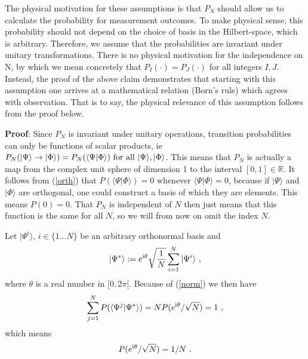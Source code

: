 \documentclass[12pt]{article}
\def\forall{\hbox{\rm for all}}
\def\beqn{\begin{eqnarray}}
\def\eeqn{\end{eqnarray}}
\begin{document}
The physical motivation for these assumptions is that $P_N$ should allow us to calculate the probability for measurement outcomes. To make physical sense, this probability should not depend on the choice of basis in the Hilbert-space, which is arbitrary. Therefore, we assume that the probabilities are invariant under unitary transformations. There is no physical motivation for the independence on N, by which we mean concretely that $P_I(\cdot) = P_J(\cdot)$ for all integers $I,J$. Instead, the proof of the above claim demonstrates that starting with this assumption one arrives at a mathematical relation (Born’s rule) which agrees with observation. That is to say, the physical relevance of this assumption follows from the proof below.

\bigskip

{\bf Proof}: Since $P_N$ is invariant under unitary operations, transition probabilities can only be functions of scalar products, ie 
$P_N(|\Psi \rangle \to |\Phi \rangle)  = P_N(\langle \Psi |\Phi \rangle) ~ \forall ~ |\Psi \rangle, |\Phi \rangle$. This means that $P_N$ is actually a map from the complex unit sphere of dimension 1 to the interval $[ 0,1] \in {\mathbb{R}}$. It follows from (\ref{orth}) that $P(\langle \Psi | \Phi \rangle) = 0$ whenever $\langle \Psi | \Phi \rangle =0$, because if $|\Psi \rangle$ and $|\Phi \rangle$ are orthogonal, one could construct a basis of which they are elements. This means $P(0) = 0$. That $P_N$ is independent of $N$ then just means that this function is the same for all $N$, so we will from now on omit the index $N$. 

Let $|\Psi^i \rangle$, $i \in \{1... N \}$ be an arbitrary orthonormal basis and
\beqn
|\Psi^* \rangle := e^{{\rm i} \theta} \sqrt{\frac{1}{N}} \sum_{i=1}^N |\Psi^i \rangle~,
\eeqn
where $\theta$ is a real number in $[0,2 \pi [$. Because of (\ref{norm}) we then have
\beqn
\sum_{j=1}^N P (\langle \Psi^j | \Psi^* \rangle)  = N  P( e^{{\rm i} \theta}/\sqrt{N}) =  1~,
\eeqn
which means
\beqn
P( e^{{\rm i} \theta} /\sqrt{N}) = 1/N ~. \label{1/N}
\eeqn
\end{document}
